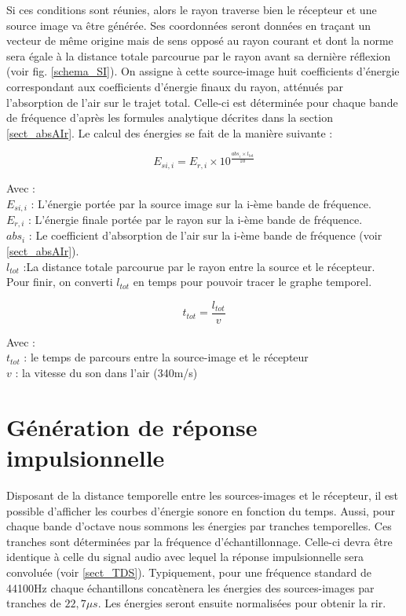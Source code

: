 Si ces conditions sont réunies, alors le rayon traverse bien le récepteur et une source image va être générée. Ses coordonnées seront données en traçant un vecteur de même origine mais de sens opposé au rayon courant et dont la norme sera égale à la distance totale parcourue par le rayon avant sa dernière réflexion (voir fig. \ref{schema_SI}). On assigne à cette source-image huit coefficients d'énergie correspondant aux coefficients d'énergie finaux du rayon, atténués par l'absorption de l'air sur le trajet total. Celle-ci est déterminée pour chaque bande de fréquence d'après les formules analytique décrites dans la section \ref{sect_absAIr}. Le calcul des énergies se fait de la manière suivante :

\begin{equation}
E_{si, i} = E_{r, i} \times 10^{\frac{abs_i \times l_{tot} }{10}}
\end{equation}

Avec : \\
$E_{si, i}$ : L'énergie portée par la source image sur la i-ème bande de fréquence. \\
$E_{r, i}$ : L'énergie finale portée par le rayon sur la i-ème bande de fréquence. \\
$abs_i$ : Le coefficient d'absorption de l'air sur la i-ème bande de fréquence (voir \ref{sect_absAIr}). \\
$ l_{tot}$ :La distance totale parcourue par le rayon entre la source et le récepteur. \\

Pour finir, on converti  $l_{tot}$ en temps pour pouvoir tracer le graphe temporel.

\begin{equation}
 t_{tot} =  \frac{l_{tot}}{v}
\end{equation}

Avec : \\
$ t_{tot}$ : le temps de parcours entre la source-image et le récepteur \\
$v$ : la vitesse du son dans l'air (340m/s)



\section{Génération de réponse impulsionnelle} \label{sect_rir}

Disposant de la distance temporelle entre les sources-images et le récepteur, il est possible d'afficher les courbes d'énergie sonore en fonction du temps. Aussi, pour chaque bande d'octave nous sommons les énergies par tranches temporelles. Ces tranches sont déterminées par la fréquence d'échantillonnage. Celle-ci devra être identique à celle du signal audio avec lequel la réponse impulsionnelle sera convoluée (voir \ref{sect_TDS}). Typiquement, pour une fréquence standard de 44100Hz chaque échantillons concatènera les énergies des sources-images par tranches de $22,7\mu s$. Les énergies seront ensuite normalisées pour obtenir la \gls{rir}.
 
